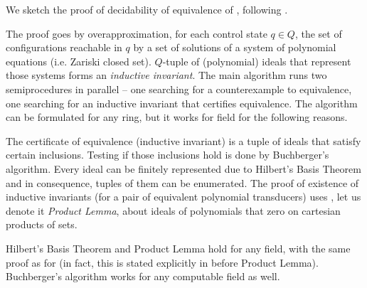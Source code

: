 
We sketch the proof of decidability of equivalence of \polTsover{\Q}, following \cite{seidlManethKemper2018}.

The proof goes by overapproximation, for each control state $q \in Q$, the set of configurations reachable in $q$ by a set of solutions of a system of polynomial equations (i.e. Zariski closed set).
$Q$-tuple of (polynomial) ideals that represent those systems forms an \emph{inductive invariant}.
The main algorithm runs two semiprocedures in parallel -- one searching for a counterexample to equivalence, one searching for an inductive invariant that certifies equivalence. The algorithm can be formulated for any ring, %
but it works for field \Q for the following reasons.

The certificate of equivalence (inductive invariant) is a tuple of ideals that satisfy certain inclusions. Testing if those inclusions hold is done by Buchberger's algorithm. Every ideal can be finitely represented due to Hilbert's Basis Theorem and in consequence, tuples of them can be enumerated.
The proof of existence of inductive invariants (for a pair of equivalent polynomial transducers) uses \cite[Lemma 6.3]{seidlManethKemper2018}, let us denote it \emph{Product Lemma}, about ideals of polynomials that zero on cartesian products of sets.

 Hilbert's Basis Theorem and Product Lemma hold for any field, with the same proof as for \Q (in fact, this is stated explicitly in \cite{seidlManethKemper2018} before Product Lemma). Buchberger's algorithm works for any computable field as well.

